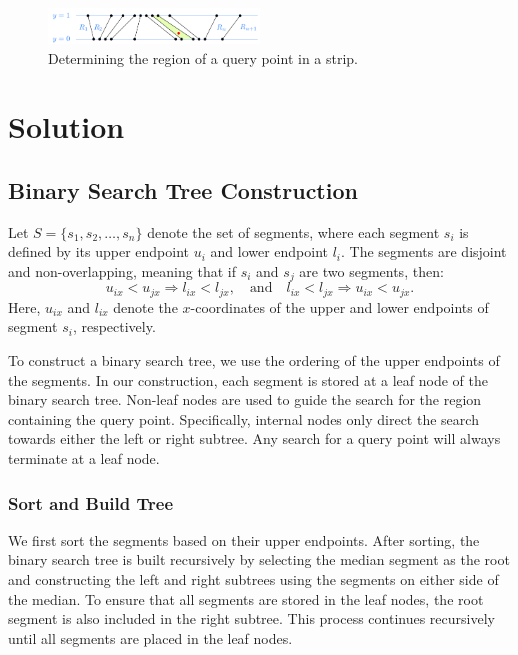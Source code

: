 \documentclass[12pt]{article}
\begin{document}
\begin{figure}[H]
    \centering
    \includegraphics[width=0.5\textwidth]{img/Q2_Diagram.png}
    \caption{Determining the region of a query point in a strip.}
    \label{fig:strip}
\end{figure}

\section*{Solution}
\subsection*{Binary Search Tree Construction}
Let \( S = \{s_1, s_2, \dots, s_n\} \) denote the set of segments, where each segment \( s_i \) is defined by its upper endpoint \( u_i \) and lower endpoint \( l_i \). The segments are disjoint and non-overlapping, meaning that if \( s_i \) and \( s_j \) are two segments, then:  
\[
u_{ix} < u_{jx} \Rightarrow l_{ix} < l_{jx}, \quad \text{and} \quad l_{ix} < l_{jx} \Rightarrow u_{ix} < u_{jx}.
\]  
Here, \( u_{ix} \) and \( l_{ix} \) denote the \( x \)-coordinates of the upper and lower endpoints of segment \( s_i \), respectively.

To construct a binary search tree, we use the ordering of the upper endpoints of the segments. In our construction, each segment is stored at a leaf node of the binary search tree. Non-leaf nodes are used to guide the search for the region containing the query point. Specifically, internal nodes only direct the search towards either the left or right subtree. Any search for a query point will always terminate at a leaf node.

\subsubsection*{Sort and Build Tree}

We first sort the segments based on their upper endpoints. After sorting, the binary search tree is built recursively by selecting the median segment as the root and constructing the left and right subtrees using the segments on either side of the median. To ensure that all segments are stored in the leaf nodes, the root segment is also included in the right subtree. This process continues recursively until all segments are placed in the leaf nodes.
\end{document}
